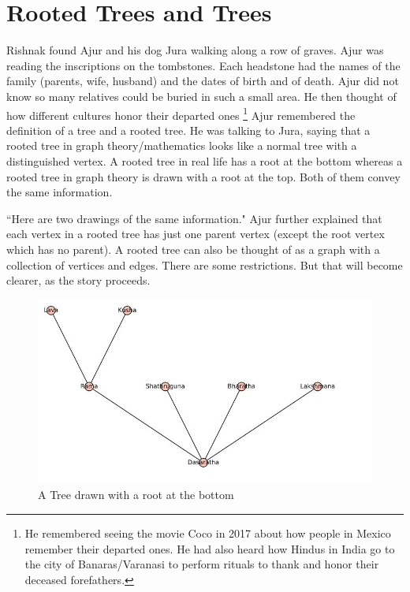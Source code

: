 \chapter{Rooted Trees and Trees}

Rishnak found Ajur and his dog Jura walking along a row of graves. Ajur was reading the inscriptions on the tombstones. Each headstone had the names of the family (parents, wife, husband) and the dates of birth and of death. Ajur did not know so many relatives could be buried in such a small area. He then thought of how different cultures honor their departed ones \footnote{He remembered seeing the movie Coco in 2017 about how people in Mexico remember their departed ones. He had also heard how Hindus in India go to the city of Banaras/Varanasi to perform rituals to thank and honor their deceased forefathers.} 
Ajur remembered the definition of a tree and a rooted tree. He was talking to Jura, saying that a rooted tree in graph theory/mathematics looks like a normal tree with a distinguished vertex. A rooted tree in real life has a root at the bottom whereas a rooted tree in graph theory is drawn with a root at the top. Both of them convey the same information.

``Here are two drawings of the same information." Ajur further explained that each vertex in a rooted tree has just one parent vertex (except the root vertex which has no parent). A rooted tree can also be thought of as a graph with a collection of vertices and edges. There are some restrictions. But that will become clearer, as the story proceeds.


\begin{figure}
\includegraphics[width=\textwidth]{tree1.JPG}
\caption{A Tree drawn with a root at the bottom}
\end{figure}


